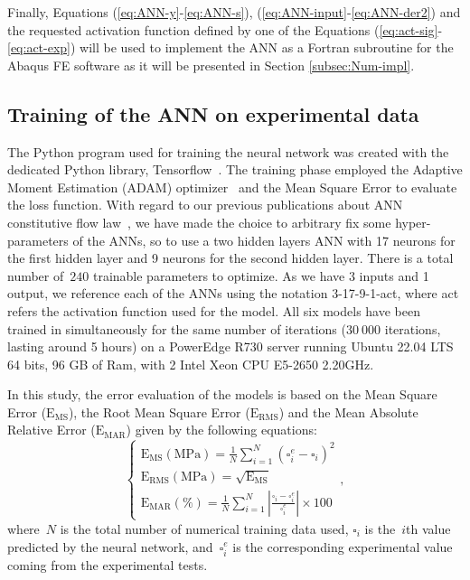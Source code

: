 \documentclass[algorithms,article,submit,pdftex,oneauthors]{Definitions/mdpi}
\DeclareRobustCommand{\MSE}{\text{E}_\text{MS}}
\DeclareRobustCommand{\RMSE}{\text{E}_\text{RMS}}
\DeclareRobustCommand{\MARE}{\text{E}_\text{MAR}}
\DeclareRobustCommand{\MPa}{\text{MPa}}
\begin{document}
Finally, Equations (\ref{eq:ANN-y}-\ref{eq:ANN-s}), (\ref{eq:ANN-input}-\ref{eq:ANN-der2}) and the requested activation function defined by one of the Equations (\ref{eq:act-sig}-\ref{eq:act-exp}) will be used to implement the ANN as a Fortran subroutine for the Abaqus FE software as it will be presented in Section \ref{subsec:Num-impl}.

\subsection{Training of the ANN on experimental data}\label{subsec:train}

The Python program used for training the neural network was created with the dedicated Python library, Tensorflow~\cite{Tensorflow-2015}.
The training phase employed the Adaptive Moment Estimation (ADAM) optimizer~\cite{Kingma-2015-AMS} and the Mean Square Error to evaluate the loss function.
With regard to our previous publications about ANN constitutive flow law~\cite{Pantale-2021-EIN}, we have made the choice to arbitrary fix some hyper-parameters of the ANNs, so to use a two hidden layers ANN with 17 neurons for the first hidden layer and 9 neurons for the second hidden layer.
There is a total number of~$240$ trainable parameters to optimize.
As we have 3 inputs and 1 output, we reference each of the ANNs using the notation 3-17-9-1-act, where act refers the activation function used for the model.
All six models have been trained in simultaneously for the same number of iterations ($30~000$ iterations, lasting around 5 hours) on a PowerEdge R730 server running Ubuntu 22.04 LTS 64 bits, 96 GB of Ram, with 2 Intel Xeon CPU E5-2650 2.20GHz.

In this study, the error evaluation of the models is based on the Mean Square Error ($\MSE$), the Root Mean Square Error ($\RMSE$) and the Mean Absolute Relative Error ($\MARE$) given by the following equations:
\begin{equation}
\begin{cases}
\MSE (\MPa) = \frac{1}{N} \sum_{i=1}^{N} \left(\square_i^e - \square_i\right)^2\\
\RMSE (\MPa) = \sqrt{\MSE}\\
\MARE(\%) = \frac{1}{N} \sum_{i=1}^{N}{\left|\frac{\square_i -\square_i^e}{\square_i^e}\right|} \times 100
\end{cases},
\label{eq:Errors}
\end{equation}
where~$N$ is the total number of numerical training data used, $\square_i$ is the~$i$th value predicted by the neural network, and~$\square_i^e$ is the corresponding experimental value coming from the experimental tests.
\end{document}
